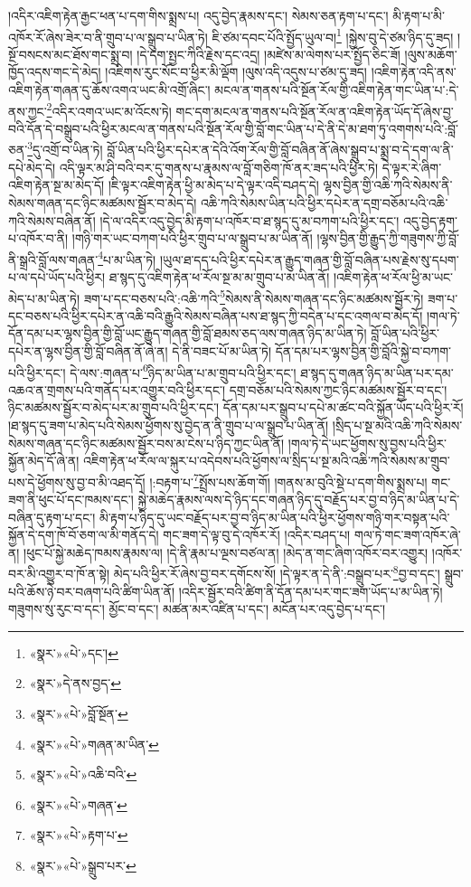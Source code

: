 །འདིར་འཇིག་རྟེན་རྒྱང་ཕན་པ་དག་གིས་སྨྲས་པ། འདུ་བྱེད་རྣམས་དང་། སེམས་ཅན་རྟག་པ་དང་། མི་རྟག་པ་མི་འཁོར་རོ་ཞེས་ཟེར་བ་ནི་གྲུབ་པ་ལ་སྒྲུབ་པ་ཡིན་ཏེ། ཇི་ཙམ་དབང་པོའི་སྤྱོད་ཡུལ་བ།\footnote{«སྣར་»«པེ་»དང་།} །སྐྱེས་བུ་དེ་ཙམ་ཉིད་དུ་ཟད། །སྔོ་བསངས་མང་ཐོས་གང་སྨྲ་བ། །དེ་དག་སྤྱང་ཀིའི་རྗེས་དང་འདྲ། །མཛེས་མ་ལེགས་པར་སྤྱོད་ཅིང་ཟོ། །ལུས་མཆོག་ཁྱོད་འདས་གང་དེ་མེད། །འཇིགས་རུང་སོང་བ་ཕྱིར་མི་ལྡོག །ལུས་འདི་འདུས་པ་ཙམ་དུ་ཟད། །འཇིག་རྟེན་འདི་ནས་འཇིག་རྟེན་གཞན་དུ་ཆོས་འགའ་ཡང་མི་འགྲོ་ཞིང་། མངལ་ན་གནས་པའི་སྔོན་རོལ་གྱི་འཇིག་རྟེན་གང་ཡིན་པ་:དེ་ནས་ཀྱང་\footnote{«སྣར་»དེ་ནས་བྱད་}འདིར་འགའ་ཡང་མ་འོངས་ཏེ། གང་དག་མངལ་ན་གནས་པའི་སྔོན་རོལ་ན་འཇིག་རྟེན་ཡོད་དོ་ཞེས་བྱ་བའི་དོན་དེ་བསྒྲུབ་པའི་ཕྱིར་མངལ་ན་གནས་པའི་སྔོན་རོལ་གྱི་བློ་གང་ཡིན་པ་དེ་ནི་དེ་མ་ཐག་ཏུ་འགགས་པའི་:བློ་ཅན་\footnote{«སྣར་»«པེ་»བློ་སྔོན་}དུ་འགྲོ་བ་ཡིན་ཏེ། བློ་ཡིན་པའི་ཕྱིར་དཔེར་ན་དེའི་འོག་རོལ་གྱི་བློ་བཞིན་ནོ་ཞེས་སྒྲུབ་པ་སྨྲ་བ་དེ་དག་ལ་ནི་དཔེ་མེད་དེ། འདི་ལྟར་མ་ཤི་བའི་བར་དུ་གནས་པ་རྣམས་ལ་བློ་གཅིག་ཁོ་ནར་ཟད་པའི་ཕྱིར་ཏེ། དེ་ལྟར་རེ་ཞིག་འཇིག་རྟེན་སྔ་མ་མེད་དོ། །ཇི་ལྟར་འཇིག་རྟེན་ཕྱི་མ་མེད་པ་དེ་ལྟར་འདི་བཤད་དེ། ལྷས་བྱིན་གྱི་འཆི་ཀའི་སེམས་ནི་སེམས་གཞན་དང་ཉིང་མཚམས་སྦྱོར་བ་མེད་དེ། འཆི་ཀའི་སེམས་ཡིན་པའི་ཕྱིར་དཔེར་ན་དགྲ་བཅོམ་པའི་འཆི་ཀའི་སེམས་བཞིན་ནོ། །དེ་ལ་འདིར་འདུ་བྱེད་མི་རྟག་པ་འཁོར་བ་ཐ་སྙད་དུ་མ་བཀག་པའི་ཕྱིར་དང་། འདུ་བྱེད་རྟག་པ་འཁོར་བ་ནི། །གཉི་གར་ཡང་བཀག་པའི་ཕྱིར་གྲུབ་པ་ལ་སྒྲུབ་པ་མ་ཡིན་ནོ། །ལྷས་བྱིན་གྱི་རྒྱུད་ཀྱི་གཟུགས་ཀྱི་བློ་ནི་སྒྲའི་བློ་ལས་གཞན་\footnote{«སྣར་»«པེ་»གཞན་མ་ཡིན་}པ་མ་ཡིན་ཏེ། །ཡུལ་ཐ་དད་པའི་ཕྱིར་དཔེར་ན་རྒྱུད་གཞན་གྱི་བློ་བཞིན་པས་རྗེས་སུ་དཔག་པ་ལ་དཔེ་ཡོད་པའི་ཕྱིར། ཐ་སྙད་དུ་འཇིག་རྟེན་ཕ་རོལ་སྔ་མ་མ་གྲུབ་པ་མ་ཡིན་ནོ། །འཇིག་རྟེན་ཕ་རོལ་ཕྱི་མ་ཡང་མེད་པ་མ་ཡིན་ཏེ། ཟག་པ་དང་བཅས་པའི་:འཆི་ཀའི་\footnote{«སྣར་»«པེ་»འཆི་བའི་}སེམས་ནི་སེམས་གཞན་དང་ཉིང་མཚམས་སྦྱོར་ཏེ། ཟག་པ་དང་བཅས་པའི་ཕྱིར་དཔེར་ན་འཆི་བའི་རྒྱུའི་སེམས་བཞིན་པས་ཐ་སྙད་ཀྱི་བདེན་པ་དང་འགལ་བ་མེད་དོ། །གལ་ཏེ་དོན་དམ་པར་ལྷས་བྱིན་གྱི་བློ་ཡང་རྒྱུད་གཞན་གྱི་བློ་ཐམས་ཅད་ལས་གཞན་ཉིད་མ་ཡིན་ཏེ། བློ་ཡིན་པའི་ཕྱིར་དཔེར་ན་ལྷས་བྱིན་གྱི་བློ་བཞིན་ནོ་ཞེ་ན། དེ་ནི་བཟང་པོ་མ་ཡིན་ཏེ། དོན་དམ་པར་ལྷས་བྱིན་གྱི་བློའི་སྐྱེ་བ་བཀག་པའི་ཕྱིར་དང་། དེ་ལས་:གཞན་པ་\footnote{«སྣར་»«པེ་»གཞན་}ཉིད་མ་ཡིན་པ་མ་གྲུབ་པའི་ཕྱིར་དང་། ཐ་སྙད་དུ་གཞན་ཉིད་མ་ཡིན་པར་དམ་འཆའ་ན་གྲགས་པའི་གནོད་པར་འགྱུར་བའི་ཕྱིར་དང་། དགྲ་བཅོམ་པའི་སེམས་ཀྱང་ཉིང་མཚམས་སྦྱོར་བ་དང་། ཉིང་མཚམས་སྦྱོར་བ་མེད་པར་མ་གྲུབ་པའི་ཕྱིར་དང་། དོན་དམ་པར་སྒྲུབ་པ་དཔེ་མ་ཚང་བའི་སྐྱོན་ཡོད་པའི་ཕྱིར་རོ། །ཐ་སྙད་དུ་ཟག་པ་མེད་པའི་སེམས་ཕྱོགས་སུ་བྱེད་ན་ནི་གྲུབ་པ་ལ་སྒྲུབ་པ་ཡིན་ནོ། །སྲིད་པ་སྔ་མའི་འཆི་ཀའི་སེམས་སེམས་གཞན་དང་ཉིང་མཚམས་སྦྱོར་བས་མ་ངེས་པ་ཉིད་ཀྱང་ཡིན་ནོ། །གལ་ཏེ་དེ་ཡང་ཕྱོགས་སུ་བྱས་པའི་ཕྱིར་སྐྱོན་མེད་དོ་ཞེ་ན། འཇིག་རྟེན་ཕ་རོལ་ལ་སྐུར་པ་འདེབས་པའི་ཕྱོགས་ལ་སྲིད་པ་སྔ་མའི་འཆི་ཀའི་སེམས་མ་གྲུབ་པས་དེ་ཕྱོགས་སུ་བྱ་བ་མི་འཐད་དོ། །:བརྟག་པ་\footnote{«སྣར་»«པེ་»རྟག་པ་}སྤྲོས་པས་ཆོག་གོ། །གནས་མ་བུའི་སྡེ་པ་དག་གིས་སྨྲས་པ། གང་ཟག་ནི་ཕུང་པོ་དང་ཁམས་དང་། སྐྱེ་མཆེད་རྣམས་ལས་དེ་ཉིད་དང་གཞན་ཉིད་དུ་བརྗོད་པར་བྱ་བ་ཉིད་མ་ཡིན་པ་དེ་བཞིན་དུ་རྟག་པ་དང་། མི་རྟག་པ་ཉིད་དུ་ཡང་བརྗོད་པར་བྱ་བ་ཉིད་མ་ཡིན་པའི་ཕྱིར་ཕྱོགས་གཉི་གར་བསྟན་པའི་སྐྱོན་དེ་དག་ཁོ་བོ་ཅག་ལ་མི་གནོད་དེ། གང་ཟག་དེ་ལྟ་བུ་དེ་འཁོར་རོ། །འདིར་བཤད་པ། གལ་ཏེ་གང་ཟག་འཁོར་ཞེ་ན། །ཕུང་པོ་སྐྱེ་མཆེད་ཁམས་རྣམས་ལ། །དེ་ནི་རྣམ་པ་ལྔས་བཙལ་ན། །མེད་ན་གང་ཞིག་འཁོར་བར་འགྱུར། །འཁོར་བར་མི་འགྱུར་བ་ཁོ་ན་སྟེ། མེད་པའི་ཕྱིར་རོ་ཞེས་བྱ་བར་དགོངས་སོ། །དེ་ལྟར་ན་དེ་ནི་:བསྒྲུབ་པར་\footnote{«སྣར་»«པེ་»སྒྲུབ་པར་}བྱ་བ་དང་། སྒྲུབ་པའི་ཆོས་ཉེ་བར་བཞག་པའི་ཚིག་ཡིན་ནོ། །འདིར་སྦྱོར་བའི་ཚིག་ནི་དོན་དམ་པར་གང་ཟག་ཡོད་པ་མ་ཡིན་ཏེ། གཟུགས་སུ་རུང་བ་དང་། མྱོང་བ་དང་། མཚན་མར་འཛིན་པ་དང་། མངོན་པར་འདུ་བྱེད་པ་དང་། 